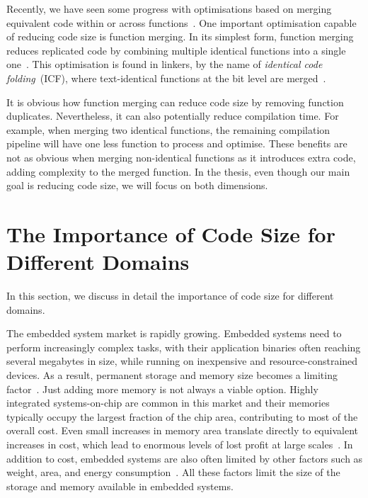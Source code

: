 Recently, we have seen some progress with optimisations based on merging equivalent code within or across functions~\cite{edler14,chabbi21}.
One important optimisation capable of reducing code size is function merging.
In its simplest form, function merging reduces replicated code by combining multiple identical functions into a single one~\cite{llvm-fm,livska14}.
This optimisation is found in linkers, by the name of \textit{identical code folding}~(ICF), where text-identical functions at the bit level are merged~\cite{tallam10,kwan12,msvc-icf}.

It is obvious how function merging can reduce code size by removing function duplicates.
Nevertheless, it can also potentially reduce compilation time.
For example, when merging two identical functions, the remaining compilation pipeline will have one less function to process and optimise.
These benefits are not as obvious when merging non-identical functions as it introduces extra code, adding complexity to the merged function.
In the thesis, even though our main goal is reducing code size, we will focus on both dimensions.

\section{The Importance of Code Size for Different Domains}

In this section, we discuss in detail the importance of code size for different domains.

The embedded system market is rapidly growing.
Embedded systems need to perform increasingly complex tasks, with their application binaries often reaching several megabytes in size, while running on inexpensive and resource-constrained devices.
As a result, permanent storage and memory size becomes a limiting factor~\cite{plaza18}.
Just adding more memory is not always a viable option.
Highly integrated systems-on-chip are common in this market and their memories typically occupy the largest fraction of the chip area, contributing to most of the overall cost.
Even small increases in memory area translate directly to equivalent increases in cost, which lead to enormous levels of lost profit at large scales~\cite{edler10}.
In addition to cost, embedded systems are also often limited by other factors such as weight, area, and energy consumption~\cite{tiggeler00,edwards20}.
All these factors limit the size of the storage and memory available in embedded systems. 

